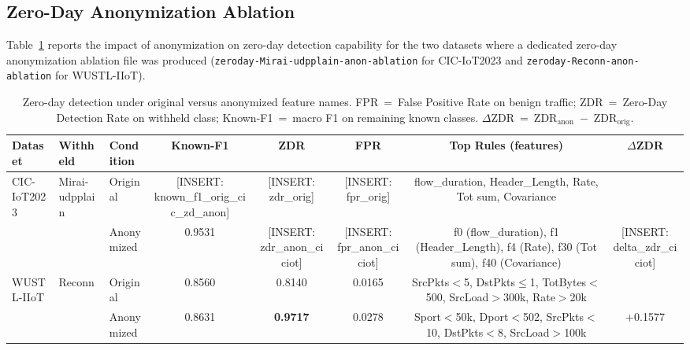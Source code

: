 \subsection{Zero-Day Anonymization Ablation}\label{app:zeroday_anon}

Table~\ref{tab:zeroday_anon_comparison} reports the impact of anonymization
on zero-day detection capability for the two datasets where a dedicated
zero-day anonymization ablation file was produced
(\texttt{zeroday-Mirai-udpplain-anon-ablation} for CIC-IoT2023 and
\texttt{zeroday-Reconn-anon-ablation} for WUSTL-IIoT).

\begin{table}[htbp]
\centering
\caption{Zero-day detection under original versus anonymized feature names.
  FPR~=~False Positive Rate on benign traffic;
  ZDR~=~Zero-Day Detection Rate on withheld class;
  Known-F1~=~macro F1 on remaining known classes.
  $\Delta$ZDR~=~ZDR$_{\text{anon}}$~$-$~ZDR$_{\text{orig}}$.}
\label{tab:zeroday_anon_comparison}
\begin{tabular}{lllccc|ccc|c}
\toprule
\textbf{Dataset} & \textbf{Withheld} & \textbf{Condition} &
  \textbf{Known-F1} & \textbf{ZDR} & \textbf{FPR} &
  \multicolumn{3}{c|}{\textbf{Top Rules (features)}} &
  \textbf{$\Delta$ZDR} \\
\midrule
CIC-IoT2023  & Mirai-udpplain &
  Original   & [INSERT: known\_f1\_orig\_cic\_zd\_anon] & [INSERT: zdr\_orig] & [INSERT: fpr\_orig] &
  \multicolumn{3}{c|}{flow\_duration, Header\_Length, Rate, Tot sum, Covariance} & \\
             &  &
  Anonymized & 0.9531 & [INSERT: zdr\_anon\_ciciot] & [INSERT: fpr\_anon\_ciciot] &
  \multicolumn{3}{c|}{f0 (flow\_duration), f1 (Header\_Length), f4 (Rate), f30 (Tot sum), f40 (Covariance)} &
  [INSERT: delta\_zdr\_ciciot] \\
\midrule
WUSTL-IIoT   & Reconn &
  Original   & 0.8560 & 0.8140 & 0.0165 &
  \multicolumn{3}{c|}{SrcPkts$<$5, DstPkts$\leq$1, TotBytes$<$500, SrcLoad$>$300k, Rate$>$20k} & \\
             &  &
  Anonymized & 0.8631 & \textbf{0.9717} & 0.0278 &
  \multicolumn{3}{c|}{Sport$<$50k, Dport$<$502, SrcPkts$<$10, DstPkts$<$8, SrcLoad$>$100k} &
  $+$0.1577 \\
\bottomrule
\end{tabular}
\end{table}

